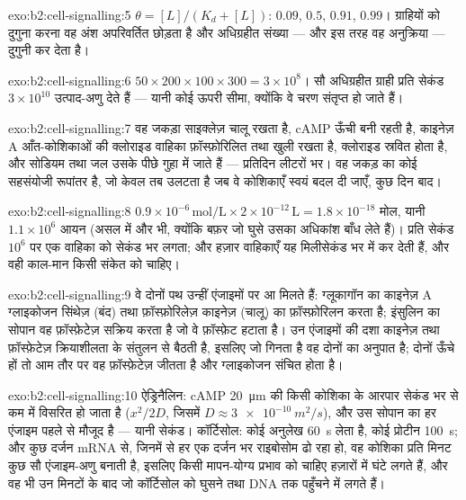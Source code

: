 \begin{solution}{exo:b2:cell-signalling:5}
$\theta = [L]/(K_d + [L])$: $0.09$, $0.5$, $0.91$, $0.99$। ग्राहियों को
दुगुना करना वह अंश अपरिवर्तित छोड़ता है और अधिग्रहीत संख्या ---
और इस तरह वह अनुक्रिया --- दुगुनी कर देता है।
\end{solution}

\begin{solution}{exo:b2:cell-signalling:6}
$50\times 200\times 100\times 300 = 3\times 10^{8}$। सौ अधिग्रहीत
ग्राही प्रति सेकंड $3\times 10^{10}$ उत्पाद-अणु देते हैं --- यानी कोई
ऊपरी सीमा, क्योंकि वे चरण संतृप्त हो जाते हैं।
\end{solution}

\begin{solution}{exo:b2:cell-signalling:7}
वह जकड़ा  साइक्लेज़ चालू रखता है, cAMP ऊँची बनी रहती है, काइनेज़ A
आँत-कोशिकाओं की क्लोराइड वाहिका फ़ॉस्फ़ोरिलित तथा
खुली रखता है, क्लोराइड स्रवित होता है, और सोडियम तथा जल उसके पीछे
गुहा में जाते हैं --- प्रतिदिन लीटरों भर। वह जकड़  का कोई
सहसंयोजी रूपांतर है, जो केवल तब उलटता है जब वे कोशिकाएँ स्वयं बदल दी जाएँ, कुछ दिन
बाद।
\end{solution}

\begin{solution}{exo:b2:cell-signalling:8}
$0.9\times 10^{-6}\,\text{mol/L}\times 2\times 10^{-12}\,\text{L} =
1.8\times 10^{-18}$ मोल, यानी $1.1\times 10^{6}$ आयन (असल में और भी, क्योंकि
बफ़र जो घुसे उसका अधिकांश बाँध लेते हैं)। प्रति सेकंड $10^{6}$ पर एक वाहिका
को सेकंड भर लगता; और हज़ार वाहिकाएँ यह मिलीसेकंड भर में कर देती हैं,
और वही काल-मान किसी संकेत को चाहिए।
\end{solution}

\begin{solution}{exo:b2:cell-signalling:9}
वे दोनों पथ उन्हीं एंजाइमों पर आ मिलते हैं: ग्लूकागॉन का काइनेज़ A
ग्लाइकोजन सिंथेज़ (बंद) तथा फ़ॉस्फ़ोरिलेज़ काइनेज़ (चालू) का
फ़ॉस्फ़ोरिलन करता है; इंसुलिन का सोपान वह फ़ॉस्फ़ेटेज़ सक्रिय करता है जो वे
फ़ॉस्फ़ेट हटाता है। उन एंजाइमों की दशा काइनेज़ तथा
फ़ॉस्फ़ेटेज़ क्रियाशीलता के संतुलन से बैठती है, इसलिए जो गिनता है वह दोनों
 का अनुपात है; दोनों ऊँचे हों तो आम तौर पर वह फ़ॉस्फ़ेटेज़ जीतता है और ग्लाइकोजन
संचित होता है।
\end{solution}

\begin{solution}{exo:b2:cell-signalling:10}
ऐड्रिनैलिन: cAMP \qty{20}{\micro m} की किसी कोशिका के आरपार सेकंड भर से
कम में विसरित हो जाता है ($x^{2}/2D$, जिसमें $D \approx \qty{3e-10}{m^2/s}$), और उस
सोपान का हर एंजाइम पहले से मौजूद है --- यानी सेकंड। कॉर्टिसोल: कोई
अनुलेख \qty{60}{s} लेता है, कोई प्रोटीन \qty{100}{s}; और कुछ
दर्जन mRNA से, जिनमें से हर एक दर्जन भर राइबोसोम ढो रहा हो, वह कोशिका प्रति मिनट कुछ
सौ एंजाइम-अणु बनाती है, इसलिए किसी मापन-योग्य प्रभाव को चाहिए हज़ारों में घंटे लगते
हैं, और वह भी उन मिनटों के बाद जो कॉर्टिसोल को घुसने तथा DNA तक पहुँचने में लगते हैं।
\end{solution}

